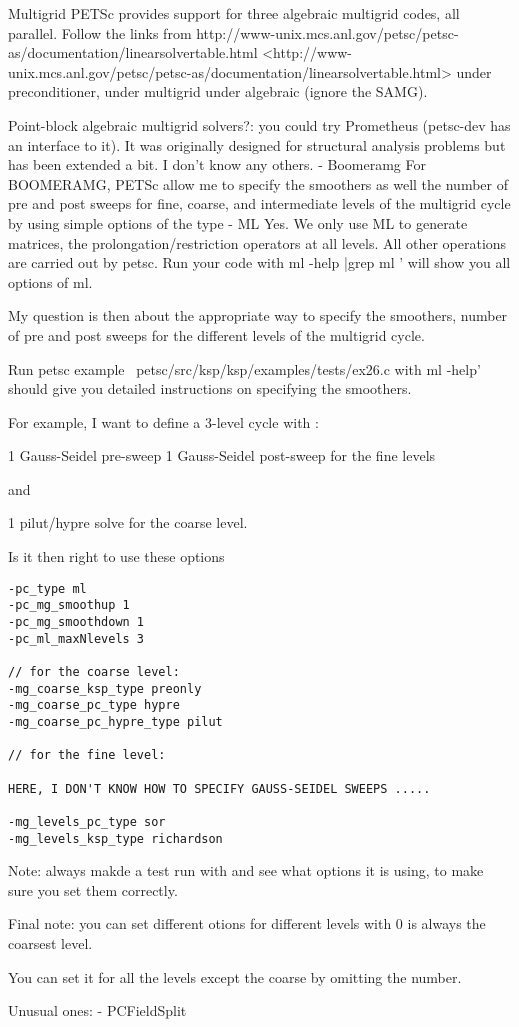 \begin{numberedframe}{Multigrid}
PETSc provides support for three algebraic multigrid codes, all 
parallel. Follow the links from 
http://www-unix.mcs.anl.gov/petsc/petsc-as/documentation/linearsolvertable.html
<http://www-unix.mcs.anl.gov/petsc/petsc-as/documentation/linearsolvertable.html>
under preconditioner, under multigrid under algebraic (ignore the SAMG).

Point-block algebraic multigrid solvers?: you could try Prometheus
(petsc-dev has an interface to it). It was originally designed for
structural analysis problems but has been extended a bit. I don't 
know any others.
- Boomeramg
For BOOMERAMG, PETSc allow me to specify the smoothers as well the
number of pre and post sweeps for fine, coarse, and intermediate levels
of the multigrid cycle by using simple options of the type
            - ML
Yes. We only use ML to generate matrices, the prolongation/restriction
operators at all levels. All other operations are carried out
by petsc. Run your code with  ml -help |grep ml '
will show you all options of ml.

My question is then about the appropriate way to specify the smoothers,
number of pre and post sweeps for the different levels of the multigrid
cycle.

Run petsc example ~petsc/src/ksp/ksp/examples/tests/ex26.c
with  ml -help' should give you detailed instructions
on specifying the smoothers.


For example, I want to define a 3-level cycle with :

1 Gauss-Seidel pre-sweep
1 Gauss-Seidel post-sweep
for the fine levels

and 

1 pilut/hypre solve for the coarse level.

Is it then right to use these options

\begin{verbatim}
-pc_type ml
-pc_mg_smoothup 1
-pc_mg_smoothdown 1
-pc_ml_maxNlevels 3

// for the coarse level:
-mg_coarse_ksp_type preonly
-mg_coarse_pc_type hypre
-mg_coarse_pc_hypre_type pilut

// for the fine level:

HERE, I DON'T KNOW HOW TO SPECIFY GAUSS-SEIDEL SWEEPS .....

-mg_levels_pc_type sor
-mg_levels_ksp_type richardson
\end{verbatim}

Note: always makde a test run with  and see
what options it is using, to make sure you set them correctly.

Final note: you can set different otions for different levels
with 
0 is always the coarsest level.

You can set it for all the levels except the coarse by omitting the
number. 
\end{numberedframe}

\begin{numberedframe}{Unusual ones:}
- PCFieldSplit
\end{numberedframe}


